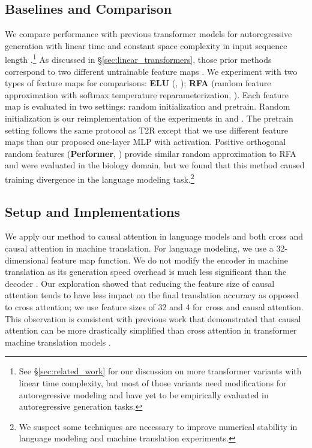 \documentclass[11pt,a4paper]{article}
\newcommand{\TRNN}{T2R\xspace}
\begin{document}
\subsection{Baselines and Comparison}
We compare performance with previous transformer models for autoregressive generation with linear time and constant space complexity in input sequence length \cite{katharopoulos-et-al-2020, RFA, performer}.\footnote{See \S\ref{sec:related_work} for our discussion on more transformer variants with linear time complexity, but most of those variants need modifications for autoregressive modeling and have yet to be empirically evaluated in autoregressive generation tasks.} 
As discussed in \S\ref{sec:linear_transformers}, those prior methods correspond to two different untrainable feature maps .
We experiment with two types of feature maps for comparisons: \textbf{ELU} (, \citealp{katharopoulos-et-al-2020}); \textbf{RFA} (random feature approximation with softmax temperature reparameterization, \citealp{RFA}).
Each feature map is evaluated in two settings: random initialization and pretrain.
Random initialization is our reimplementation of the experiments in \citet{katharopoulos-et-al-2020} and \citet{RFA}.
The pretrain setting follows the same protocol as \TRNN except that we use different feature maps  than our proposed one-layer MLP with  activation.
Positive orthogonal random features (\textbf{Performer}, \citealp{performer}) provide similar random approximation to RFA and were evaluated in the biology domain, but we found that this method caused training divergence in the language modeling task.\footnote{We suspect some techniques are necessary to improve numerical stability in language modeling and machine translation experiments. }


 


\subsection{Setup and Implementations}
We apply our method to causal attention in language models and both cross and causal attention in machine translation.
For language modeling, we use a 32-dimensional feature map function.
We do not modify the encoder in machine translation as its generation speed overhead is much less significant than the decoder \cite{deepshallow}.
Our exploration showed that reducing the feature size of causal attention tends to have less impact on the final translation accuracy as opposed to cross attention; we use feature sizes of 32 and 4 for cross and causal attention. 
This observation is consistent with previous work that demonstrated that causal attention can be more drastically simplified than cross attention in transformer machine translation models \cite{you-etal-2020-hard, synthesizer}.
\end{document}
